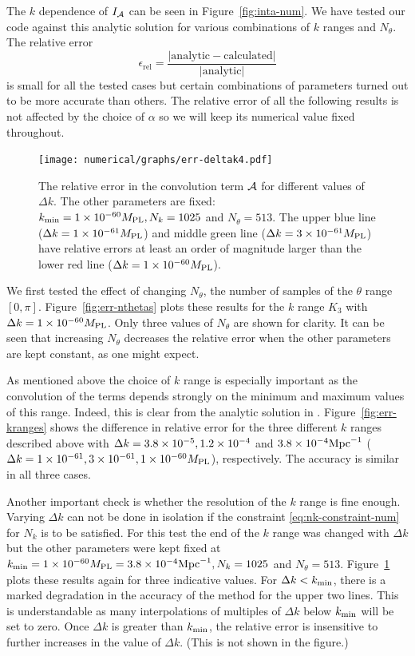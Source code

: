 % 
The $k$ dependence of $I_{\mathcal{A}}$ can be seen in Figure~\ref{fig:inta-num}. 
We have tested our code against this analytic solution for various
combinations of $k$ ranges and $N_\theta$. The relative error
%
\begin{equation}
 \epsilon_\mathrm{rel} = \frac{|\mathrm{analytic}- \mathrm{calculated}
|}{|\mathrm{analytic}|}
\end{equation}
%
is small for all the tested cases but certain combinations of
parameters turned out to be more accurate than others. The relative error of
all the following results is not affected by the choice of $\alpha$ so
we will keep its numerical value fixed throughout.

\begin{figure}[htb]
 \centering
 \texttt{[image: numerical/graphs/err-deltak4.pdf]}
 \caption[Relative error in the convolution term $\A$]{The relative error in the
convolution term $\A$ for different values of $\Delta k$.
The other parameters are fixed: $k_{\mathrm{min}}=1\times10^{-60}M_{\mathrm{PL}}, N_k = 1025$ and $N_\theta=513$. The
upper 
blue line ($\Delta k=1\times 10^{-61}M_{\mathrm{PL}}$) and middle green line ($\Delta k=3\times 10^{-61}M_{\mathrm{PL}}$)
have relative errors at least an order of magnitude larger than the lower red line
($\Delta k=1\times 10^{-60}M_{\mathrm{PL}}$).}
 \label{fig:err-deltaks}
\end{figure}


We first tested the effect of changing $N_\theta$, the number of
samples of the $\theta$ range $[0,\pi]$.  Figure~\ref{fig:err-nthetas}
plots these results for the $k$ range $K_3$ with $\Delta k =
1\times 10^{-60}M_{\mathrm{PL}}$. Only three values of $N_\theta$ are shown for clarity. It
can be seen that increasing $N_\theta$ decreases the relative error when the other
parameters are kept constant, as one
might expect.


As mentioned above the choice of $k$ range is especially important as
the convolution of the terms depends strongly on the minimum and
maximum values of this range. Indeed, this is clear from the analytic
solution in . Figure~\ref{fig:err-kranges}
shows the difference in relative error for the three different $k$
ranges described above with 
$\Delta k= 3.8\times 10^{-5}, 1.2\times 10^{-4}$ and $3.8\times 10^{-4}\mathrm{Mpc}^{-1}$
($\Delta k= 1\times 10^{-61}, 3\times 10^{-61},1\times 10^{-60}M_{\mathrm{PL}}$),
respectively. The accuracy is similar in all three cases.


Another important check is whether the resolution of the $k$ range is
fine enough. Varying $\Delta k$ can not be done in isolation if the
constraint \eqref{eq:nk-constraint-num} for $N_k$ is to
be satisfied. For this test the end of the $k$ range was changed with $\Delta k$
but the other parameters were kept fixed at $k_{\mathrm{min}}=1\times 10^{-60}M_{\mathrm{PL}}=3.8\times 10^{-4}\mathrm{Mpc}^{-1},
N_k = 1025$ and $N_\theta=513$. Figure~\ref{fig:err-deltaks} plots
these results again for three indicative values.  For $\Delta
k<k_{\mathrm{min}}$, there is a marked degradation in
the accuracy of the method for the upper two lines. This is understandable as many
interpolations of multiples of $\Delta k$ below $k_{\mathrm{min}}$ will be set to
zero. Once $\Delta k$ is greater than $k_{\mathrm{min}}$, the relative error is
insensitive to further increases in the value of $\Delta k$. (This is not shown in
the figure.)


